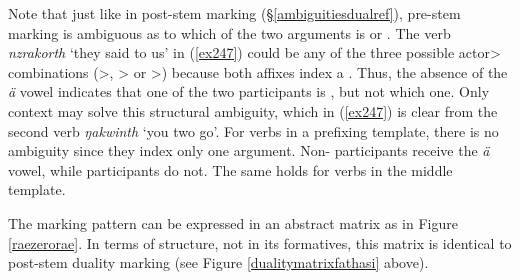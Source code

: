 Note that just like in post-stem  marking (\S{}\ref{ambiguitiesdualref}), pre-stem  marking is ambiguous as to which of the two arguments is  or . The verb \emph{nzrakorth} `they said to us' in (\ref{ex247}) could be any of the three possible actor> combinations (\Pl>\Du, \Du>\Du{} or \Du>\Pl) because both  affixes index a  . Thus, the absence of the \emph{ä} vowel indicates that one of the two participants is , but not which one. Only context may solve this structural ambiguity, which in (\ref{ex247}) is clear from the second verb \emph{ŋakwinth} `you two go'. For verbs in a prefixing template, there is no ambiguity since they index only one argument. Non- participants receive the \emph{ä} vowel, while  participants do not. The same holds for verbs in the middle template.%

The marking pattern can be expressed in an abstract matrix as in Figure \ref{raezerorae}. In terms of structure, not in its formatives, this matrix is identical to post-stem duality marking (see Figure \ref{dualitymatrixfathasi} above).

